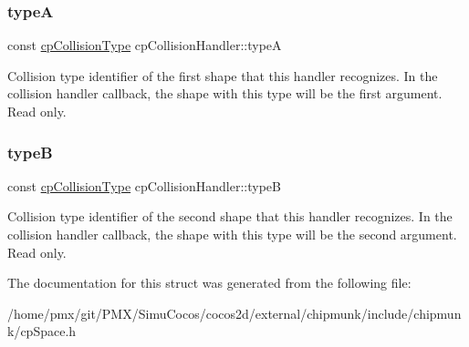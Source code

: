 \subsubsection{\texorpdfstring{typeA}{typeA}}
{\footnotesize\ttfamily const \hyperlink{group__basicTypes_gae83e2f50965eb441e36ffff1e32e6d02}{cp\+Collision\+Type} cp\+Collision\+Handler\+::typeA}

Collision type identifier of the first shape that this handler recognizes. In the collision handler callback, the shape with this type will be the first argument. Read only. \mbox{\label{structcpCollisionHandler_a7f9def10b179d18de37bec5b3c6d8621}} 
\subsubsection{\texorpdfstring{typeB}{typeB}}
{\footnotesize\ttfamily const \hyperlink{group__basicTypes_gae83e2f50965eb441e36ffff1e32e6d02}{cp\+Collision\+Type} cp\+Collision\+Handler\+::typeB}

Collision type identifier of the second shape that this handler recognizes. In the collision handler callback, the shape with this type will be the second argument. Read only. 

The documentation for this struct was generated from the following file\+:\begin{DoxyCompactItemize}
\item 
/home/pmx/git/\+P\+M\+X/\+Simu\+Cocos/cocos2d/external/chipmunk/include/chipmunk/cp\+Space.\+h\end{DoxyCompactItemize}
